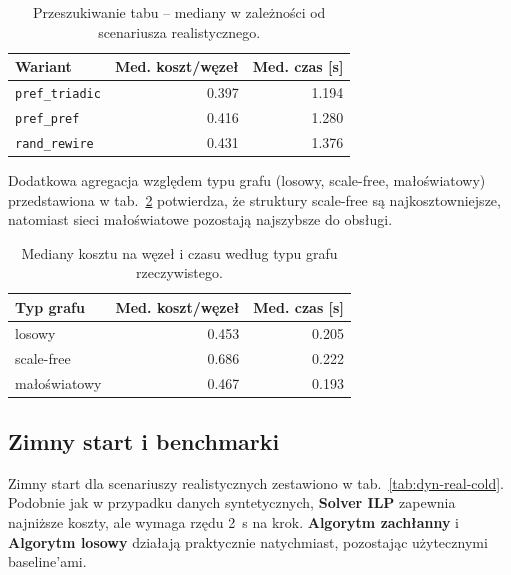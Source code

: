 \begin{table}[H]
  \centering
  \caption{Przeszukiwanie tabu -- mediany w zależności od scenariusza realistycznego.}
  \label{tab:dyn-real-variants}
  \begin{tabular}{lrr}
    \toprule
    \textbf{Wariant}       & \textbf{Med. koszt/węzeł} & \textbf{Med. czas [s]} \\
    \midrule
    \texttt{pref\_triadic} & 0.397                     & 1.194                  \\
    \texttt{pref\_pref}    & 0.416                     & 1.280                  \\
    \texttt{rand\_rewire}  & 0.431                     & 1.376                  \\
  \end{tabular}
\end{table}

Dodatkowa agregacja względem typu grafu (losowy, scale-free, małoświatowy) przedstawiona w tab.~\ref{tab:dyn-real-graph-type} potwierdza, że struktury scale-free są najkosztowniejsze, natomiast sieci małoświatowe pozostają najszybsze do obsługi.

\begin{table}[H]
  \centering
  \caption{Mediany kosztu na węzeł i czasu według typu grafu rzeczywistego.}
  \label{tab:dyn-real-graph-type}
  \begin{tabular}{lrr}
    \toprule
    \textbf{Typ grafu} & \textbf{Med. koszt/węzeł} & \textbf{Med. czas [s]} \\
    \midrule
    losowy             & 0.453                     & 0.205                  \\
    scale-free         & 0.686                     & 0.222                  \\
    małoświatowy       & 0.467                     & 0.193                  \\
  \end{tabular}
\end{table}

\subsection{Zimny start i benchmarki}

Zimny start dla scenariuszy realistycznych zestawiono w tab.~\ref{tab:dyn-real-cold}. Podobnie jak w przypadku danych syntetycznych, \textbf{Solver ILP} zapewnia najniższe koszty, ale wymaga rzędu 2~s na krok. \textbf{Algorytm zachłanny} i \textbf{Algorytm losowy} działają praktycznie natychmiast, pozostając użytecznymi baseline'ami.

